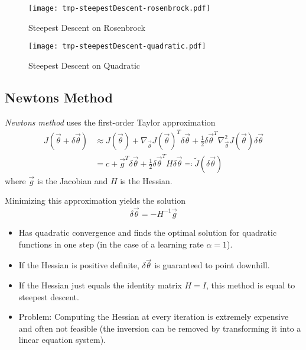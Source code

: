 				\begin{figure}
					\centering
					\texttt{[image: tmp-steepestDescent-rosenbrock.pdf]}
					\caption{Steepest Descent on Rosenbrock}
					\label{fig:steepestDescentExampleRosenbrock}
				\end{figure}
				\begin{figure}
					\centering
					\texttt{[image: tmp-steepestDescent-quadratic.pdf]}
					\caption{Steepest Descent on Quadratic}
					\label{fig:steepestDescentExampleQuadratic}
				\end{figure}

		\subsection{Newtons Method}
			\emph{Newtons method} uses the first-order Taylor approximation
			\begin{align}
				J(\vec{\theta} + \delta\vec{\theta}) &\approx J(\vec{\theta}) + \nabla_{\vec{\theta}} J(\vec{\theta})^T \delta\vec{\theta} + \frac{1}{2} \delta\vec{\theta}^T \nabla_{\vec{\theta}}^2 J(\vec{\theta}) \delta\vec{\theta} \\
					&= c + \vec{g}^T \delta\vec{\theta} + \frac{1}{2} \delta\vec{\theta}^T H \delta\vec{\theta} \eqqcolon \tilde{J}(\delta\vec{\theta})
			\end{align}
			where \(\vec{g}\) is the Jacobian and \(H\) is the Hessian.

			Minimizing this approximation yields the solution
			\begin{equation}
				\delta\vec{\theta} = -H^{-1} \vec{g}
			\end{equation}

			\begin{itemize}
				\item Has quadratic convergence and finds the optimal solution for quadratic functions in one step (in the case of a learning rate \(\alpha = 1\)).
				\item If the Hessian is positive definite, \(\delta\vec{\theta}\) is guaranteed to point downhill.
				\item If the Hessian just equals the identity matrix \( H = I \), this method is equal to steepest descent.
				\item Problem: Computing the Hessian at every iteration is extremely expensive and often not feasible (the inversion can be removed by transforming it into a linear equation system).
			\end{itemize}

